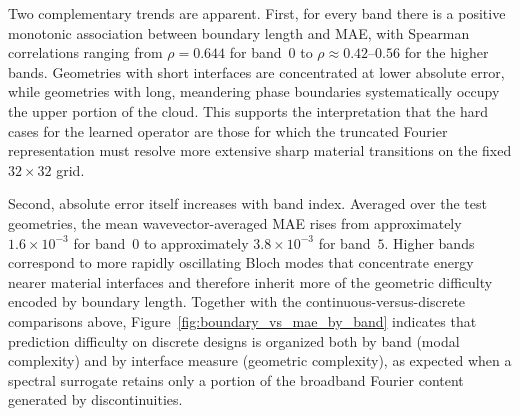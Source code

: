 \documentclass[preprint,review,12pt]{elsarticle}
\begin{document}
Two complementary trends are apparent. First, for every band there is a positive monotonic association between boundary length and MAE, with Spearman correlations ranging from $\rho=0.644$ for band~$0$ to $\rho\approx0.42$--$0.56$ for the higher bands. Geometries with short interfaces are concentrated at lower absolute error, while geometries with long, meandering phase boundaries systematically occupy the upper portion of the cloud. This supports the interpretation that the hard cases for the learned operator are those for which the truncated Fourier representation must resolve more extensive sharp material transitions on the fixed $32\times32$ grid.

Second, absolute error itself increases with band index. Averaged over the test geometries, the mean wavevector-averaged MAE rises from approximately $1.6\times10^{-3}$ for band~$0$ to approximately $3.8\times10^{-3}$ for band~$5$. Higher bands correspond to more rapidly oscillating Bloch modes that concentrate energy nearer material interfaces and therefore inherit more of the geometric difficulty encoded by boundary length. Together with the continuous-versus-discrete comparisons above, Figure~\ref{fig:boundary_vs_mae_by_band} indicates that prediction difficulty on discrete designs is organized both by band (modal complexity) and by interface measure (geometric complexity), as expected when a spectral surrogate retains only a portion of the broadband Fourier content generated by discontinuities.

\end{document}
